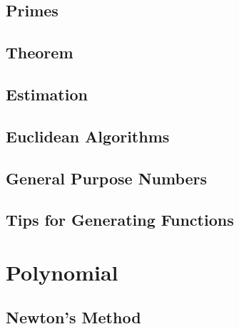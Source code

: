 \subsection{Primes}

\subsection{Theorem}

\subsection{Estimation}

\subsection{Euclidean Algorithms}

\subsection{General Purpose Numbers}

\subsection{Tips for Generating Functions}


\section{Polynomial}
\subsection{Newton's Method}


